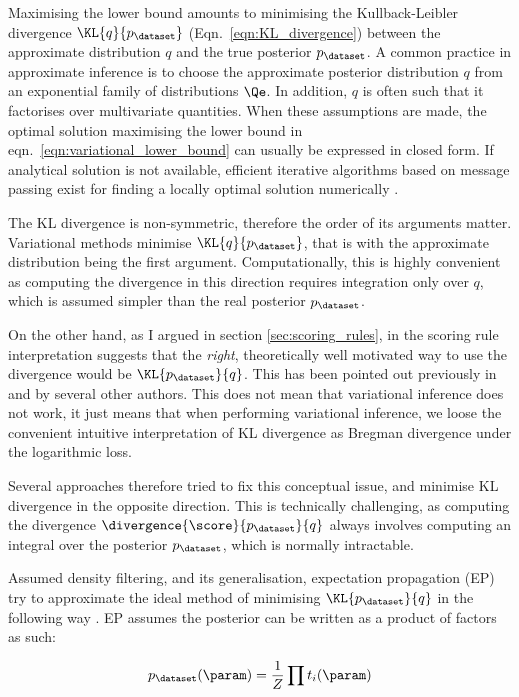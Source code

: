 Maximising the lower bound amounts to minimising the Kullback-Leibler divergence $\KL{q}{p_{\dataset}}$ (Eqn.\ \eqref{eqn:KL_divergence}) between the approximate distribution $q$ and the true posterior $p_{\dataset}$. A common practice in approximate inference is to choose the approximate posterior distribution $q$ from an exponential family of distributions $\Qe$. In addition, $q$ is often such that it factorises over multivariate quantities. When these assumptions are made, the optimal solution maximising the lower bound in eqn.\ \eqref{eqn:variational_lower_bound} can usually be expressed in closed form. If analytical solution is not available, efficient iterative algorithms based on message passing exist for finding a locally optimal solution numerically \citep{Winn2006}.

The KL divergence is non-symmetric, therefore the order of its arguments matter. Variational methods minimise $\KL{q}{p_{\dataset}}$, that is with the approximate distribution being the first argument. Computationally, this is highly convenient as computing the divergence in this direction requires integration only over $q$, which is assumed simpler than the real posterior $p_{\dataset}$. 

On the other hand, as I argued in section \ref{sec:scoring_rules}, in the scoring rule interpretation suggests that the \emph{right}, theoretically well motivated way to use the divergence would be $\KL{p_{\dataset}}{q}$. This has been pointed out previously in \citep{Csato2002,Minka2001} and by several other authors. This does not mean that variational inference does not work, it just means that when performing variational inference, we loose the convenient intuitive interpretation of KL divergence as Bregman divergence under the logarithmic loss.

Several approaches therefore tried to fix this conceptual issue, and minimise KL divergence in the opposite direction. This is technically challenging, as computing the divergence $\divergence{\score}{p_{\dataset}}{q}$ always involves computing an integral over the posterior $p_{\dataset}$, which is normally intractable.

Assumed density filtering, and its generalisation, expectation propagation (EP) try to approximate the ideal method of minimising $\KL{p_{\dataset}}{q}$ in the following way \citep{Minka2001thesis}. EP assumes the posterior can be written as a product of factors as such: 

\begin{equation}
	p_{\dataset}(\param) = \frac{1}{Z} \prod t_i(\param)
\end{equation}

